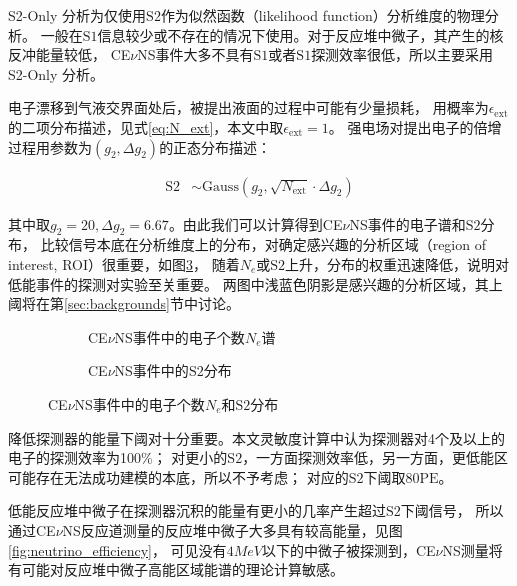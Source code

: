 S2-Only 分析为仅使用$\mathrm{S2}$作为似然函数（likelihood function）分析维度的物理分析。
一般在$\mathrm{S1}$信息较少或不存在的情况下使用。对于反应堆中微子，其产生的核反冲能量较低，
CE$\nu$NS事件大多不具有$\mathrm{S1}$或者$\mathrm{S1}$探测效率很低，所以主要采用S2-Only 分析。

电子漂移到气液交界面处后，被提出液面的过程中可能有少量损耗，
用概率为$\epsilon_\mathrm{ext}$的二项分布描述，见式\ref{eq:N_ext}，本文中取$\epsilon_\mathrm{ext}=1$。
强电场对提出电子的倍增过程用参数为$(g_2,\Delta g_2)$的正态分布描述：

\begin{align}
    \label{eq:s2}
    \mathrm{S2} &\sim \mathrm{Gauss}\left(g_2,\sqrt{N_\mathrm{ext}}\cdot\Delta g_2\right)
\end{align}

其中取$g_2=20,\Delta g_2=6.67$。由此我们可以计算得到CE$\nu$NS事件的电子谱和$\mathrm{S2}$分布，
比较信号本底在分析维度上的分布，对确定感兴趣的分析区域（region of interest, ROI）很重要，如图\ref{fig:S2eS2_rate}，
随着$N_e$或$\mathrm{S2}$上升，分布的权重迅速降低，说明对低能事件的探测对实验至关重要。
两图中浅蓝色阴影是感兴趣的分析区域，其上阈将在第\ref{sec:backgrounds}节中讨论。

\begin{figure}
  \begin{subfigure}{.5\textwidth}
    \centering
    
    \caption{\label{fig:S2e_rate} CE$\nu$NS事件中的电子个数$N_e$谱}
  \end{subfigure}
  \begin{subfigure}{.5\textwidth}
    \centering
    
    \caption{\label{fig:S2_rate} CE$\nu$NS事件中的$\mathrm{S2}$分布}
  \end{subfigure}
  \caption{\label{fig:S2eS2_rate} CE$\nu$NS事件中的电子个数$N_e$和$\mathrm{S2}$分布}
\end{figure}

降低探测器的能量下阈对十分重要。本文灵敏度计算中认为探测器对4个及以上的电子的探测效率为100\%；
对更小的$\mathrm{S2}$，一方面探测效率低，另一方面，更低能区可能存在无法成功建模的本底，所以不予考虑；
对应的$\mathrm{S2}$下阈取$80\mathrm{PE}$。

低能反应堆中微子在探测器沉积的能量有更小的几率产生超过$\mathrm{S2}$下阈信号，
所以通过CE$\nu$NS反应道测量的反应堆中微子大多具有较高能量，见图\ref{fig:neutrino_efficiency}，
可见没有$4\si{MeV}$以下的中微子被探测到，CE$\nu$NS测量将有可能对反应堆中微子高能区域能谱的理论计算敏感。

